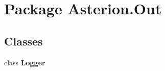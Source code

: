 \hypertarget{namespaceAsterion_1_1Out}{\section{Package Asterion.\-Out}
\label{namespaceAsterion_1_1Out}
}
\subsection*{Classes}
\begin{DoxyCompactItemize}
\item 
class {\bfseries Logger}
\end{DoxyCompactItemize}
